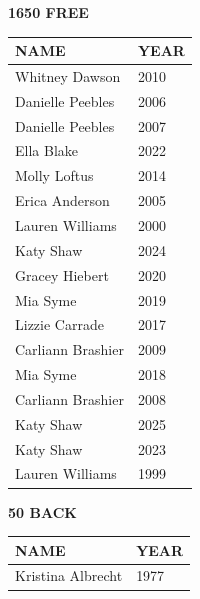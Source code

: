 \begin{table}[H]
\centering
\begin{minipage}[t]{0.48\textwidth}
\centering
\textbf{1650 FREE}\\[0.1cm]
\begin{tabular}{@{}p{2.8cm}p{1.2cm}@{}}
\hline
    \textbf{NAME} & \textbf{YEAR} \\
\hline
    Whitney Dawson & 2010 \\
    Danielle Peebles & 2006 \\
    Danielle Peebles & 2007 \\
    Ella Blake & 2022 \\
    Molly Loftus & 2014 \\
    Erica Anderson & 2005 \\
    Lauren Williams & 2000 \\
    Katy Shaw & 2024 \\
    Gracey Hiebert & 2020 \\
    Mia Syme & 2019 \\
    Lizzie Carrade & 2017 \\
    Carliann Brashier & 2009 \\
    Mia Syme & 2018 \\
    Carliann Brashier & 2008 \\
    Katy Shaw & 2025 \\
    Katy Shaw & 2023 \\
    Lauren Williams & 1999 \\
\hline
\end{tabular}
\end{minipage}\hfill
\begin{minipage}[t]{0.48\textwidth}
\centering
\textbf{50 BACK}\\[0.1cm]
\begin{tabular}{@{}p{2.8cm}p{1.2cm}@{}}
\hline
    \textbf{NAME} & \textbf{YEAR} \\
\hline
    Kristina Albrecht & 1977 \\
\hline
\end{tabular}
\end{minipage}
\end{table}

